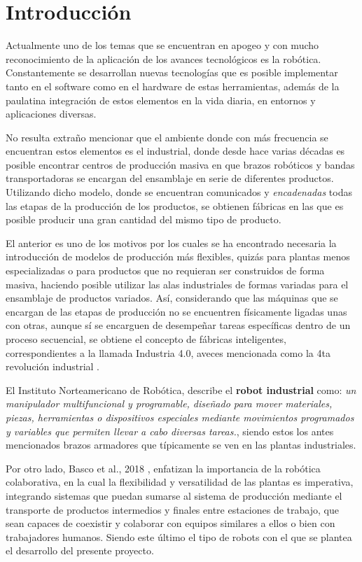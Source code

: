 \chapter{Introducción}

 Actualmente uno de los temas que se encuentran en apogeo y con mucho reconocimiento de la aplicación de los avances tecnológicos es la robótica. Constantemente se desarrollan nuevas tecnologías que es posible implementar tanto en el software como en el hardware de estas herramientas, además de la paulatina integración de estos elementos en la vida diaria, en entornos y aplicaciones diversas.


 No resulta extraño mencionar que el ambiente donde con más frecuencia se encuentran estos elementos es el industrial, donde desde hace varias décadas es posible encontrar centros de producción masiva en que brazos robóticos y bandas transportadoras se encargan del ensamblaje en serie de diferentes productos. Utilizando dicho modelo, donde se encuentran comunicados y \textit{encadenadas} todas las etapas de la producción de los productos, se obtienen fábricas en las que es posible producir una gran cantidad del mismo tipo de producto.


 El anterior es uno de los motivos por los cuales se ha encontrado necesaria la introducción de modelos de producción más flexibles, quizás para plantas menos especializadas o para productos que no requieran ser construidos de forma masiva, haciendo posible utilizar las alas industriales de formas variadas para el ensamblaje de productos variados. Así, considerando que las máquinas que se encargan de las etapas de producción no se encuentren físicamente ligadas unas con otras, aunque sí se encarguen de desempeñar tareas específicas dentro de un proceso secuencial, se obtiene el concepto de fábricas inteligentes, correspondientes a la llamada Industria 4.0, aveces mencionada como la 4ta revolución industrial \cite{kohout_multi-robot_2020}.   

El Instituto Norteamericano de Robótica, describe el \textbf{robot industrial} como: \textit{un manipulador multifuncional y programable, diseñado para mover materiales, piezas, herramientas o dispositivos especiales mediante movimientos programados y variables que permiten llevar a cabo diversas tareas.}\cite{navarro_pina_robot_2021}, siendo estos los antes mencionados brazos armadores que típicamente se ven en las plantas industriales. 

Por otro lado, Basco et al., 2018 \cite{basco_industria_2018}, enfatizan la importancia de la robótica colaborativa, en la cual la flexibilidad y versatilidad de las plantas es imperativa, integrando sistemas que puedan sumarse al sistema de producción  mediante el transporte de productos intermedios y finales entre estaciones de trabajo, que sean capaces de coexistir y colaborar con equipos similares a ellos o bien con trabajadores humanos. Siendo este último el tipo de robots con el que se plantea el desarrollo del presente proyecto.
 
